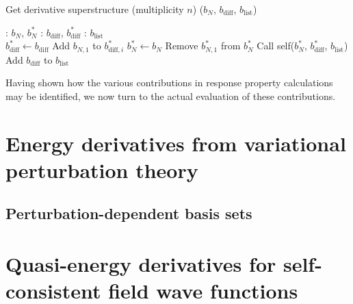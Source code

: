 \documentclass[%
 reprint,
 amsmath,amssymb,
 aps,
]{revtex4-1}
\begin{document}

\begin{algorithm}
\caption{Get derivative superstructure (multiplicity $n$) ($b_{N}$, $b_{\text{diff}}$, $b_{\text{list}}$)}
\label{GET-DS}
\begin{algorithmic}
: $b_{N}$, $b_{N}^{*}$
: $b_{\text{diff}}$, $b_{\text{diff}}^{*}$
: $b_{\text{list}}$\\

         \State $b_{\text{diff}}^{*} \gets b_{\text{diff}}$
         \State Add $b_{N, 1}$ to $b_{\text{diff}, i}^{*}$
         \State $b_{N}^{*} \gets b_{N}$
         \State Remove $b_{N, 1}^{*}$ from $b_{N}^{*}$
         \State Call self($b_{N}^{*}$, $b_{\text{diff}}^{*}$, $b_{\text{list}}$) %
      \EndFor
   \Else
            \State Add $b_{\text{diff}}$ to $b_{\text{list}}$
         \EndIf
      \EndIf
   \EndIf
\end{algorithmic}
\end{algorithm}

Having shown how the various contributions in response property calculations
may be identified, we now turn to the actual evaluation of these contributions.

\section{\label{sec:VPT}Energy derivatives from variational perturbation theory}

\subsection{\label{sec:PDBS}Perturbation-dependent basis sets}

\section{\label{sec:QE-derivatives}Quasi-energy derivatives for self-consistent field wave functions}
\end{document}
